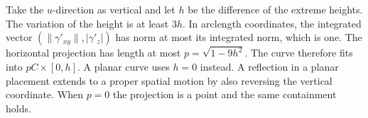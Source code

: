 Take the $u$-direction as vertical and let $h$ be the difference of the
extreme heights. The variation of the height is at least $3h$. In arclength
coordinates, the integrated vector
$(\|\gamma'_{xy}\|,|\gamma'_z|)$ has norm at most its integrated norm,
which is one. The horizontal projection has length at most
$p=\sqrt{1-9h^2}$. The curve therefore fits into
$pC\times[0,h]$. A planar curve uses $h=0$ instead. A reflection in a
planar placement extends to a proper spatial motion by also reversing the
vertical coordinate. When $p=0$ the projection is a point and the same
containment holds.

